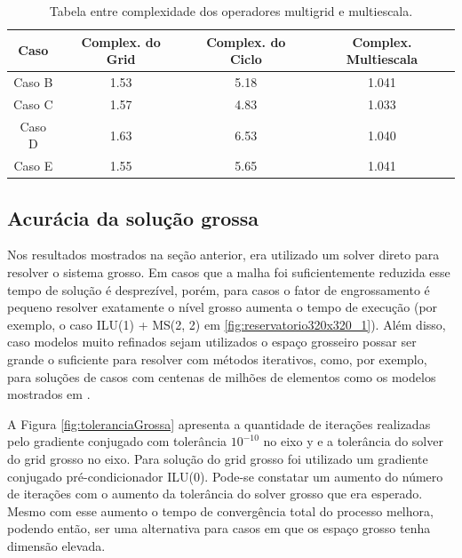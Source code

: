 \begin{table}[]
\centering
\caption{Tabela entre complexidade dos operadores multigrid e multiescala.} \label{tab:comparacaoMsxMgComplexidade}
\begin{tabular}{|c|c|c|c|}
\hline
\textbf{Caso} & \textbf{Complex. do Grid} & \textbf{Complex. do Ciclo} & \textbf{Complex. Multiescala} \\ \hline
Caso B        & 1.53                          & 5.18                           & 1.041                             \\ \hline
Caso C        & 1.57                          & 4.83                           & 1.033                             \\ \hline
Caso D        & 1.63                          & 6.53                           & 1.040                             \\ \hline
Caso E        & 1.55                          & 5.65                           & 1.041                             \\ \hline
\end{tabular}
\end{table}

\subsection{Acurácia da solução grossa}

Nos resultados mostrados na seção anterior, era utilizado um solver direto para resolver o sistema grosso. Em casos que a malha foi suficientemente reduzida esse tempo de solução é desprezível, porém, para casos o fator de engrossamento é pequeno resolver exatamente o nível grosso aumenta o tempo de execução (por exemplo, o caso ILU(1) + MS(2, 2) em \ref{fig:reservatorio320x320_1}). Além disso, caso modelos muito refinados sejam utilizados o espaço grosseiro possar ser grande o suficiente para resolver com métodos iterativos, como, por exemplo, para soluções de casos com centenas de milhões de elementos como os modelos mostrados em \cite{geomecrio}.

A Figura \ref{fig:toleranciaGrossa} apresenta a quantidade de iterações realizadas pelo gradiente conjugado com tolerância $10^{-10}$ no eixo y e a tolerância do solver do grid grosso no eixo. Para solução do grid grosso foi utilizado um gradiente conjugado pré-condicionador ILU(0). Pode-se constatar um aumento do número de iterações com o aumento da tolerância do solver grosso que era esperado. Mesmo com esse aumento o tempo de convergência total do processo melhora, podendo então, ser uma alternativa para casos em que os espaço grosso tenha dimensão elevada.



